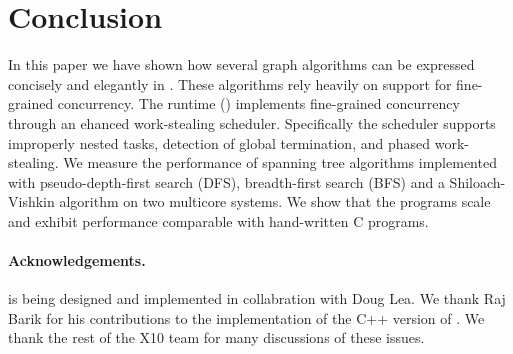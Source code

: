 \section{Conclusion}\label{s:concl}

In this paper we have shown how several graph algorithms can be
expressed concisely and elegantly in \Xten. These algorithms rely
heavily on support for fine-grained concurrency. The \Xten{} runtime
(\XWS) implements fine-grained concurrency through an ehanced
work-stealing scheduler. Specifically the scheduler supports
improperly nested tasks, detection of global termination, and phased
work-stealing.  We measure the performance of spanning tree algorithms
implemented with pseudo-depth-first search (DFS), breadth-first search
(BFS) and a Shiloach-Vishkin algorithm on two multicore systems. We
show that the \XWS{} programs scale and exhibit performance comparable
with hand-written C programs.

\paragraph{Acknowledgements.} \XWS{} is being designed and implemented in collabration with Doug Lea. We thank Raj Barik for his contributions to the implementation of the C++ version of \XWS. We thank the rest of the X10 team for many discussions of these issues.